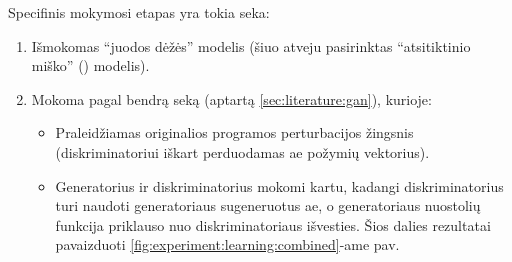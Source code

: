 Specifinis  mokymosi etapas yra tokia seka:
\begin{enumerate}
    \item Išmokomas \enquote{juodos dėžės} modelis (šiuo atveju pasirinktas
          \enquote{atsitiktinio miško} () modelis).
    \item Mokoma pagal bendrą seką (aptartą \ref{sec:literature:gan}), kurioje:
          \begin{itemize}
              \item Praleidžiamas originalios programos perturbacijos žingsnis (diskriminatoriui
                    iškart perduodamas \acs{ae} požymių vektorius).
              \item Generatorius ir diskriminatorius mokomi kartu, kadangi diskriminatorius turi
                    naudoti generatoriaus sugeneruotus \acs{ae}, o generatoriaus nuostolių funkcija
                    priklauso nuo diskriminatoriaus išvesties. Šios dalies rezultatai pavaizduoti
                    \ref{fig:experiment:learning:combined}-ame pav.
          \end{itemize}
\end{enumerate}

